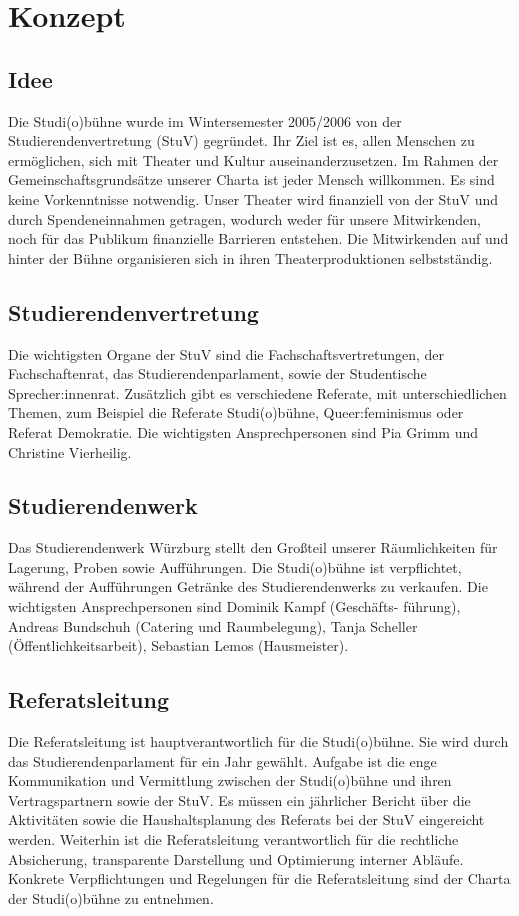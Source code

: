 \section{Konzept}
\subsection{Idee}
Die Studi(o)bühne wurde im Wintersemester 2005/2006 von der Studierendenvertretung (StuV) gegründet.	
Ihr Ziel ist es, allen Menschen zu ermöglichen, sich mit Theater und Kultur auseinanderzusetzen. Im Rahmen der Gemeinschaftsgrundsätze unserer Charta ist jeder Mensch willkommen. Es sind keine Vorkenntnisse notwendig.
Unser Theater wird finanziell von der StuV und durch Spendeneinnahmen getragen, wodurch weder für unsere Mitwirkenden, noch für das Publikum finanzielle Barrieren entstehen. 	
Die Mitwirkenden auf und hinter der Bühne organisieren sich in ihren Theaterproduktionen selbstständig. 

\subsection{Studierendenvertretung}
Die wichtigsten Organe der StuV sind die Fachschaftsvertretungen, der Fachschaftenrat, das Studierendenparlament, sowie der Studentische Sprecher:innenrat. Zusätzlich gibt es verschiedene Referate, mit unterschiedlichen Themen, zum Beispiel die Referate Studi(o)bühne, Queer:feminismus oder Referat Demokratie.
Die wichtigsten Ansprechpersonen sind Pia Grimm und Christine Vierheilig.

\subsection{Studierendenwerk}
Das Studierendenwerk Würzburg stellt den Großteil unserer Räumlichkeiten für Lagerung, Proben sowie Aufführungen.	
Die Studi(o)bühne ist verpflichtet, während der Aufführungen Getränke des Studierendenwerks zu verkaufen.  
Die wichtigsten Ansprechpersonen sind Dominik Kampf (Geschäfts- führung), Andreas Bundschuh (Catering und Raumbelegung), Tanja Scheller (Öffentlichkeitsarbeit), Sebastian Lemos (Hausmeister).

\subsection{Referatsleitung}
Die Referatsleitung ist hauptverantwortlich für die Studi(o)bühne. Sie wird durch das Studierendenparlament für ein Jahr gewählt.
Aufgabe ist die enge Kommunikation und Vermittlung zwischen der Studi(o)bühne und ihren Vertragspartnern sowie der StuV. Es müssen ein jährlicher Bericht über die Aktivitäten sowie die Haushaltsplanung des Referats bei der StuV eingereicht werden.	
Weiterhin ist die Referatsleitung verantwortlich für die rechtliche Absicherung, transparente Darstellung und Optimierung interner Abläufe.
Konkrete Verpflichtungen und Regelungen für die Referatsleitung sind der Charta der Studi(o)bühne zu entnehmen.	

